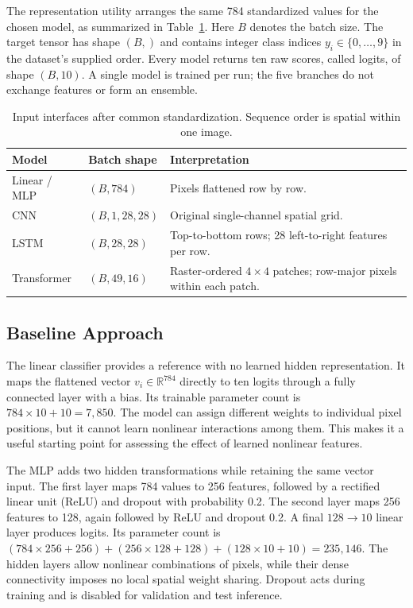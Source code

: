 The representation utility arranges the same 784 standardized values for the
chosen model, as summarized in Table~\ref{tab:meth_inputs}. Here $B$ denotes the
batch size. The target tensor has shape $(B,)$ and contains integer class
indices $y_i\in\{0,\ldots,9\}$ in the dataset's supplied order. Every model
returns ten raw scores, called logits, of shape $(B,10)$. A single model is
trained per run; the five branches do not exchange features or form an ensemble.

\begin{table}[H]\centering
\caption{Input interfaces after common standardization. Sequence order is
spatial within one image.}\label{tab:meth_inputs}
\begin{tabularx}{\linewidth}{l l X}\toprule
Model & Batch shape & Interpretation\\\midrule
Linear / MLP & $(B,784)$ & Pixels flattened row by row.\\
CNN & $(B,1,28,28)$ & Original single-channel spatial grid.\\
LSTM & $(B,28,28)$ & Top-to-bottom rows; 28 left-to-right features per row.\\
Transformer & $(B,49,16)$ & Raster-ordered $4\times4$ patches; row-major pixels within each patch.\\
\bottomrule\end{tabularx}\end{table}

\clearpage
\subsection{Baseline Approach}
\label{sec:meth_baselines}
The linear classifier provides a reference with no learned hidden
representation. It maps the flattened vector $v_i\in\mathbb{R}^{784}$ directly
to ten logits through a fully connected layer with a bias. Its trainable
parameter count is $784\times10+10=7{,}850$. The model can assign different
weights to individual pixel positions, but it cannot learn nonlinear
interactions among them. This makes it a useful starting point for assessing
the effect of learned nonlinear features.

The MLP adds two hidden transformations while retaining the same vector input.
The first layer maps 784 values to 256 features, followed by a rectified linear
unit (ReLU) and dropout with probability 0.2. The second layer maps 256 features
to 128, again followed by ReLU and dropout 0.2. A final $128\to10$ linear layer
produces logits. Its parameter count is
$(784\times256+256)+(256\times128+128)+(128\times10+10)=235{,}146$.
The hidden layers allow nonlinear combinations of pixels, while their dense
connectivity imposes no local spatial weight sharing. Dropout acts during
training and is disabled for validation and test inference.

